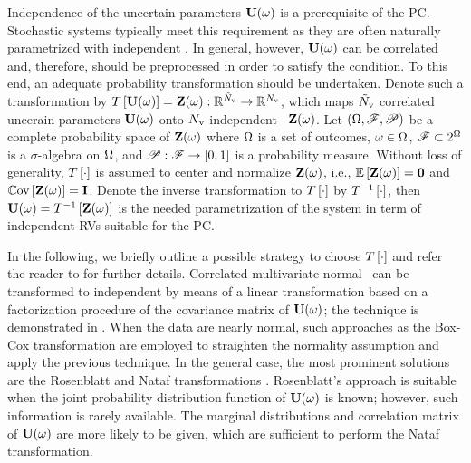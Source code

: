 Independence of the uncertain parameters $\mathbf{U}(\omega)$ is a prerequisite of the PC. Stochastic systems typically meet this requirement as they are often naturally parametrized \cite{xiu2010} with independent \rvs. In general, however, $\mathbf{U}(\omega)$ can be correlated and, therefore, should be preprocessed in order to satisfy the condition. To this end, an adequate probability transformation should be undertaken. Denote such a transformation by $T\left[\mathbf{U}(\omega)\right] = \mathbf{Z}(\omega): \mathbb{R}^{\tilde{N}_\text{v}} \to \mathbb{R}^{N_\text{v}}$, which maps ${\tilde{N}_\text{v}}$ correlated uncerain parameters $\mathbf{U}(\omega)$ onto ${N_\text{v}}$ independent \rvs\ $\mathbf{Z}(\omega)$. Let $(\Omega, \mathscr{F}, \mathscr{P})$ be a complete probability space \cite{durrett2010} of $\mathbf{Z}(\omega)$ where $\Omega$ is a set of outcomes, $\omega \in \Omega$, $\mathscr{F} \subset 2^\Omega$ is a $\sigma$-algebra on $\Omega$, and $\mathscr{P}: \mathscr{F} \to [0, 1]$ is a probability measure. Without loss of generality, $T\left[\cdot\right]$ is assumed to center and normalize $\mathbf{Z}(\omega)$, i.e., $\oExp{\vZ(\o)} = \mZero$ and $\oCov{\vZ(\o)} = \mI$. Denote the inverse transformation to $T\left[\cdot\right]$ by $T^{-1}\left[\cdot\right]$, then $\mathbf{U}(\omega) = T^{-1}\left[\mathbf{Z}(\omega)\right]$ is the needed parametrization of the system in term of independent RVs suitable for the PC.

In the following, we briefly outline a possible strategy to choose $T\left[\cdot\right]$ and refer the reader to \cite{xiu2010, eldred2009} for further details. Correlated multivariate normal \rvs\ can be transformed to independent by means of a linear transformation based on a factorization procedure of the covariance matrix of $\mathbf{U}(\omega)$; the technique is demonstrated in . When the data are nearly normal, such approaches as the Box-Cox transformation are employed to straighten the normality assumption and apply the previous technique. In the general case, the most prominent solutions are the Rosenblatt and Nataf transformations \cite{eldred2009}. Rosenblatt's approach is suitable when the joint probability distribution function of $\mathbf{U}(\omega)$ is known; however, such information is rarely available. The marginal distributions and correlation matrix of $\mathbf{U}(\omega)$ are more likely to be given, which are sufficient to perform the Nataf transformation.
